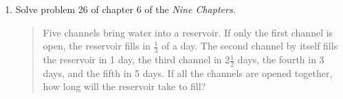 \begin{exercisessec}{}{}
\begin{enumerate}
	  \item%
	  Solve problem 26 of chapter 6 of the \emph{Nine Chapters.}
	  \begin{quote}
	  	Five channels bring water into a reservoir. If only the first channel is open, the reservoir fills in $\frac 13$ of a day. The second channel by itself fills the reservoir in 1 day, the third channel in $2\frac 12$ days, the fourth in 3 days, and the fifth in 5 days. If all the channels are opened together, how long will the reservoir take to fill?
	  \end{quote}
	
	\end{enumerate}  

\end{exercisessec}